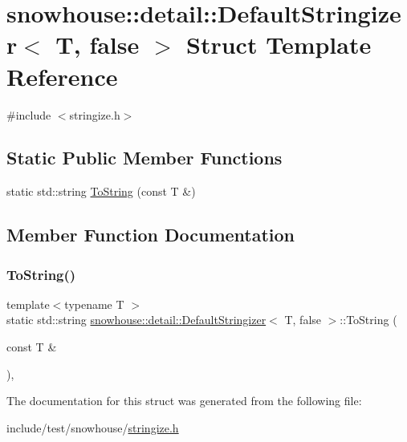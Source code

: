 \hypertarget{structsnowhouse_1_1detail_1_1DefaultStringizer_3_01T_00_01false_01_4}{}\section{snowhouse\+::detail\+::Default\+Stringizer$<$ T, false $>$ Struct Template Reference}
\label{structsnowhouse_1_1detail_1_1DefaultStringizer_3_01T_00_01false_01_4}


{\ttfamily \#include $<$stringize.\+h$>$}

\subsection*{Static Public Member Functions}
\begin{DoxyCompactItemize}
\item 
static std\+::string \mbox{\hyperlink{structsnowhouse_1_1detail_1_1DefaultStringizer_3_01T_00_01false_01_4_a68a5d25dc4dc5111075c4291f7cebf3f}{To\+String}} (const T \&)
\end{DoxyCompactItemize}


\subsection{Member Function Documentation}
\mbox{\label{structsnowhouse_1_1detail_1_1DefaultStringizer_3_01T_00_01false_01_4_a68a5d25dc4dc5111075c4291f7cebf3f}} 
\subsubsection{\texorpdfstring{ToString()}{ToString()}}
{\footnotesize\ttfamily template$<$typename T $>$ \\
static std\+::string \mbox{\hyperlink{structsnowhouse_1_1detail_1_1DefaultStringizer}{snowhouse\+::detail\+::\+Default\+Stringizer}}$<$ T, false $>$\+::To\+String (\begin{DoxyParamCaption}\item[{const T \&}]{ }\end{DoxyParamCaption})\hspace{0.3cm}{\ttfamily [inline]}, {\ttfamily [static]}}



The documentation for this struct was generated from the following file\+:\begin{DoxyCompactItemize}
\item 
include/test/snowhouse/\mbox{\hyperlink{stringize_8h}{stringize.\+h}}\end{DoxyCompactItemize}
